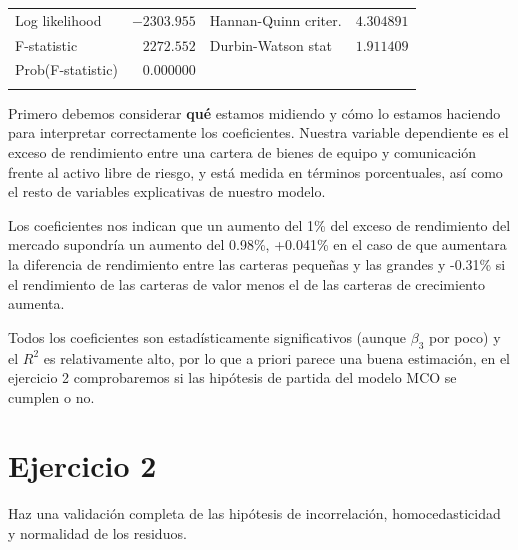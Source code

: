 \documentclass[12pt]{article}
\numberwithin{equation}{section} %
\begin{document}
\begin{table}[!h]
\begin{tabular}{lrrrr}
\multicolumn{1}{l}{Log likelihood}&\multicolumn{1}{r}{$-2303.955$}&\multicolumn{2}{l}{Hannan-Quinn criter.}&\multicolumn{1}{r}{$4.304891$}\\
\multicolumn{1}{l}{F-statistic}&\multicolumn{1}{r}{$2272.552$}&\multicolumn{2}{l}{Durbin-Watson stat}&\multicolumn{1}{r}{$1.911409$}\\
\multicolumn{1}{l}{Prob(F-statistic)}&\multicolumn{1}{r}{$0.000000$}&\multicolumn{1}{c}{}&\multicolumn{1}{c}{}&\multicolumn{1}{c}{}\\
[4.5pt] \hline \\ [-4.5pt]
\end{tabular}
\end{table}

Primero debemos considerar \textbf{qué} estamos midiendo y cómo lo estamos haciendo para interpretar correctamente los coeficientes. Nuestra variable dependiente es el exceso de rendimiento entre una cartera de bienes de equipo y comunicación frente al activo libre de riesgo, y está medida en términos porcentuales, así como el resto de variables explicativas de nuestro modelo.

Los coeficientes nos indican que un aumento del 1\% del exceso de rendimiento del mercado supondría un aumento del 0.98\%, +0.041\% en el caso de que aumentara la diferencia de rendimiento entre las carteras pequeñas y las grandes y -0.31\% si el rendimiento de las carteras de valor menos el de las carteras de crecimiento aumenta.

Todos los coeficientes son estadísticamente significativos (aunque $\beta_3$ por poco) y el $R^2$ es relativamente alto, por lo que a priori parece una buena estimación, en el ejercicio 2 comprobaremos si las hipótesis de partida del modelo MCO se cumplen o no.

\section{Ejercicio 2} Haz una validación completa de las hipótesis de incorrelación, homocedasticidad y normalidad de los residuos.
\end{document}
